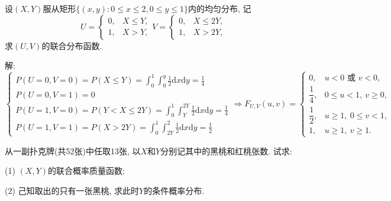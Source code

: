 \documentclass[standard]{ExBook}
\renewenvironment{shaded}{%
  \def\FrameCommand{\fboxsep=\FrameSep \colorbox{shadecolor}}%
  \MakeFramed{\advance\hsize-\width \FrameRestore}%
}{%
  \endMakeFramed
}
\begin{document}
\begin{qitems}
    \begin{bbox}
    \begin{shaded}
        \qitem
设$(X,Y)$服从矩形$\{(x,y):0\leq x\leq 2, 0\leq y\leq 1\}$内的均匀分布, 记
$$
    U=
    \left\{
    \begin{array}{ll}
        0, & X\leq Y,\\
        1, & X>Y,
    \end{array}
    \right.
    V=
    \left\{
    \begin{array}{ll}
        0, & X\leq 2Y,\\
        1, & X>2Y,
    \end{array}
    \right.
$$
求$(U,V)$的联合分布函数.
    \end{shaded}
    \end{bbox}

\vspace{\dimexpr2.5cm-5em\relax}

解: 
$$
    \left\{
    \begin{array}{ll}
        P(U=0,V=0)=P(X\leq Y)=\int_{0}^{1}\int_{0}^{y}\frac{1}{2}\mathrm{d}x\mathrm{d}y=\displaystyle\frac{1}{4}\\
        P(U=0,V=1)=0\\
        P(U=1,V=0)=P(Y<X\leq 2Y)=\int_{0}^{1}\int_{Y}^{2Y}\frac{1}{2}\mathrm{d}x\mathrm{d}y=\displaystyle\frac{1}{4}\\
        P(U=1,V=1)=P(X>2Y)=\int_{0}^{1}\int_{2Y}^{2}\frac{1}{2}\mathrm{d}x\mathrm{d}y=\displaystyle\frac{1}{2}
    \end{array}
    \right.
\Longrightarrow
F_{U,V}(u,v)=
\left\{
\begin{array}{ll}
0, & u<0 \text{ 或 } v<0,\\
\dfrac{1}{4}, & 0\leq u<1,\ v\geq 0,\\
\dfrac{1}{2}, & u\geq 1,\ 0\leq v<1,\\
1, & u\geq 1,\ v\geq 1.
\end{array}
\right.
$$

\vspace{2.5cm-5em}

    \begin{bbox}
    \begin{shaded}
        \qitem
从一副扑克牌(共52张)中任取13张, 以$X$和$Y$分别记其中的黑桃和红桃张数. 试求:

(1) $(X,Y)$的联合概率质量函数;

(2) 己知取出的只有一张黑桃, 求此时$Y$的条件概率分布.
    \end{shaded}
    \end{bbox}


\end{qitems}
\end{document}
